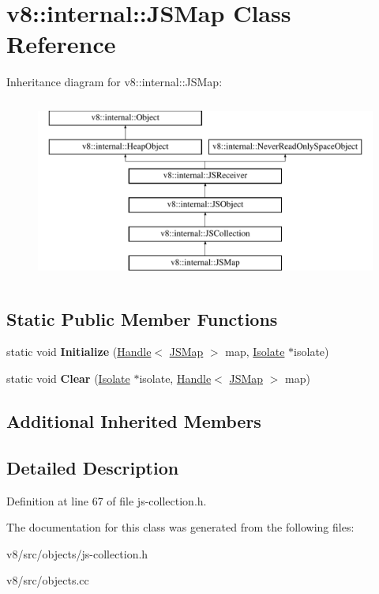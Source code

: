 \hypertarget{classv8_1_1internal_1_1JSMap}{}\section{v8\+:\+:internal\+:\+:J\+S\+Map Class Reference}
\label{classv8_1_1internal_1_1JSMap}
Inheritance diagram for v8\+:\+:internal\+:\+:J\+S\+Map\+:\begin{figure}[H]
\begin{center}
\leavevmode
\includegraphics[height=6.000000cm]{classv8_1_1internal_1_1JSMap}
\end{center}
\end{figure}
\subsection*{Static Public Member Functions}
\begin{DoxyCompactItemize}
\item 
\mbox{\label{classv8_1_1internal_1_1JSMap_a8311701adf455f220d3160150f0dae61}} 
static void {\bfseries Initialize} (\mbox{\hyperlink{classv8_1_1internal_1_1Handle}{Handle}}$<$ \mbox{\hyperlink{classv8_1_1internal_1_1JSMap}{J\+S\+Map}} $>$ map, \mbox{\hyperlink{classv8_1_1internal_1_1Isolate}{Isolate}} $\ast$isolate)
\item 
\mbox{\label{classv8_1_1internal_1_1JSMap_ad07544ab5fe31b331e82963c0a6ac84b}} 
static void {\bfseries Clear} (\mbox{\hyperlink{classv8_1_1internal_1_1Isolate}{Isolate}} $\ast$isolate, \mbox{\hyperlink{classv8_1_1internal_1_1Handle}{Handle}}$<$ \mbox{\hyperlink{classv8_1_1internal_1_1JSMap}{J\+S\+Map}} $>$ map)
\end{DoxyCompactItemize}
\subsection*{Additional Inherited Members}


\subsection{Detailed Description}


Definition at line 67 of file js-\/collection.\+h.



The documentation for this class was generated from the following files\+:\begin{DoxyCompactItemize}
\item 
v8/src/objects/js-\/collection.\+h\item 
v8/src/objects.\+cc\end{DoxyCompactItemize}
